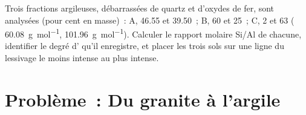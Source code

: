 \begin{exercise}[$\star\star\star$]\label{exo:b1:weathering-clays:12}
Trois fractions argileuses, débarrassées de quartz et d'oxydes de fer, sont analysées (pour
cent en masse)~: A,  \num{46.55} et  \num{39.50}~; B,  60 et
 25~; C,  2 et  63 (
\qty{60.08}{g.mol^{-1}},  \qty{101.96}{g.mol^{-1}}). Calculer le
rapport molaire Si/Al de chacune, identifier le degré d' qu'il enregistre, et
placer les trois sols sur une ligne du lessivage le moins intense au plus intense.
\end{exercise}

\section{Problème~: Du granite à l'argile}

